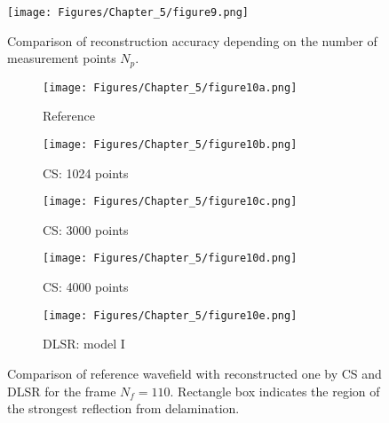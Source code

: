 \begin{figure} [h!]
	\centering
	\texttt{[image: Figures/Chapter\_5/figure9.png]}
	\caption{Comparison of reconstruction accuracy depending on the number of measurement points $N_p$.}
	\label{fig:points_metrics}
\end{figure}

\begin{figure} [h!]
	\centering
	\begin{subfigure}[b]{0.32\textwidth}
		\centering
		\texttt{[image: Figures/Chapter\_5/figure10a.png]}
		\caption{Reference}
		\label{fig:frame110_ref}
	\end{subfigure}
	\hfill
	\begin{subfigure}[b]{0.32\textwidth}
		\centering
		\texttt{[image: Figures/Chapter\_5/figure10b.png]}
		\caption{CS: 1024 points}
		\label{fig:frame110_CS1024}
	\end{subfigure}
	\hfill
	\begin{subfigure}[b]{0.32\textwidth}
		\centering
		\texttt{[image: Figures/Chapter\_5/figure10c.png]}
		\caption{CS: 3000 points}
		\label{fig:frame110_CS3000}
	\end{subfigure}	
	\hfill
	\begin{subfigure}[b]{0.32\textwidth}
		\centering
		\texttt{[image: Figures/Chapter\_5/figure10d.png]}
		\caption{CS: 4000 points}
		\label{fig:frame110_CS4000}
	\end{subfigure}
	\begin{subfigure}[b]{0.32\textwidth}
		\centering
		\texttt{[image: Figures/Chapter\_5/figure10e.png]}
		\caption{DLSR: model I}
		\label{fig:frame110_Abdalraheem}
	\end{subfigure}
	\caption{Comparison of reference wavefield with reconstructed one by CS and DLSR for the frame $N_f = 110$. Rectangle box indicates the region of the strongest reflection from delamination.}
	\label{fig:frame110_comparison}
\end{figure}


